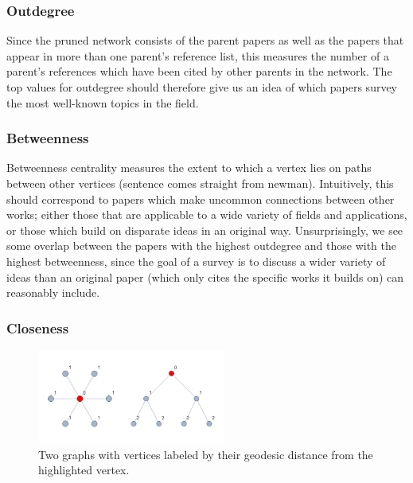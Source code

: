 \documentclass[12pt]{thesis}
\theoremstyle{plain}
\theoremstyle{definition}
\theoremstyle{remark}
\begin{document}
\subsubsection{Outdegree} Since the pruned network consists of the parent papers as well as the papers that appear in more than one parent's reference list, this measures the number of a parent's references which have been cited by other parents in the network. The top values for outdegree should therefore give us an idea of which papers survey the most well-known topics in the field.


\subsubsection{Betweenness} Betweenness centrality measures the extent to which a vertex lies on paths between other vertices (sentence comes straight from newman). Intuitively, this should correspond to papers which make uncommon connections between other works; either those that are applicable to a wide variety of fields and applications, or those which build on disparate ideas in an original way. Unsurprisingly, we see some overlap between the papers with the highest outdegree and those with the highest betweenness, since the goal of a survey is to discuss a wider variety of ideas than an original paper (which only cites the specific works it builds on) can reasonably include.


\subsubsection{Closeness} 

\begin{figure}
\centering
\vspace{-25pt}
\includegraphics[width=0.55\textwidth]{closeness_demo.png}
\vspace{-10pt}
\caption{Two graphs with vertices labeled by their geodesic distance from the highlighted vertex.}
\vspace{-20pt}
\label{fig:closeness_demo}
\end{figure}
\end{document}

